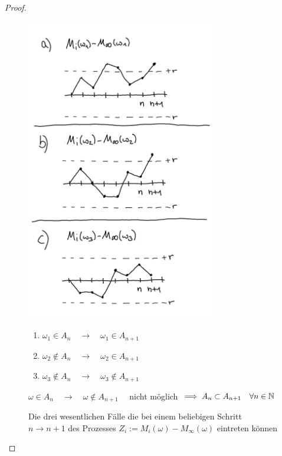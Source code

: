 \documentclass[12pt,a4paper]{article}
\begin{document}
\begin{proof}
	\begin{figure}
			\caption{Die drei wesentlichen Fälle die bei einem beliebigen Schritt $n\rightarrow n+1$ des Prozesses $Z_i:=M_i(\omega)-M_\infty(\omega)$ eintreten können}
			\includegraphics[width=0.75\textwidth]{pics/SketchUE1.png}
			\begin{enumerate}[label=Fall \alph{*})]
				\item \qquad $\omega_1 \in A_n \quad \rightarrow\quad \omega_1 \in A_{n+1}$
				\item \qquad $\omega_2 \not\in A_n \quad \rightarrow \quad \omega_2 \in A_{n+1}$
				\item \qquad $\omega_3 \not\in A_n \quad \rightarrow \quad \omega_3 \not\in A_{n+1}$
			\end{enumerate}
			$\omega \in A_n \quad \rightarrow \quad \omega \not\in A_{n+1} \quad$ nicht möglich $\implies A_n \subset A_{n+1} \quad\forall n\in\mathbb{N}$
			\label{AbbUEProzess}
	\end{figure}
\end{proof}
\end{document}
